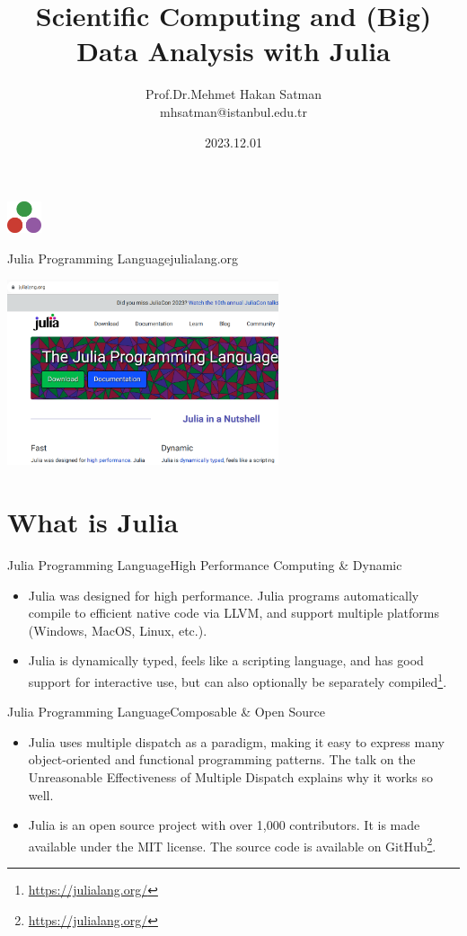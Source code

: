 \documentclass[11pt]{beamer}
\author{Prof.Dr.Mehmet Hakan Satman \\ mhsatman@istanbul.edu.tr}
\title{Scientific Computing and (Big) Data Analysis with Julia}
\institute{Istanbul University}
\date{2023.12.01}
\begin{document}
\begin{frame}
\includegraphics[width=1cm]{images/julia.png}
\titlepage
\end{frame}


\begin{frame}[fragile]{Julia Programming Language}{julialang.org}
	\begin{center}
		\includegraphics[width=8cm]{images/thesite.png}
	\end{center}
\end{frame}

\section{What is Julia}
\begin{frame}[fragile]{Julia Programming Language}{High Performance Computing \& Dynamic}
\begin{itemize}
	\item Julia was designed for high performance. Julia programs automatically compile to efficient native code via LLVM, and support multiple platforms (Windows, MacOS, Linux, etc.).
	
	\item Julia is dynamically typed, feels like a scripting language, and has good support for interactive use, but can also optionally be separately compiled\footnote{\url{https://julialang.org/}}.
\end{itemize}
\end{frame}



\begin{frame}[fragile]{Julia Programming Language}{Composable \& Open Source}
	\begin{itemize}
		\item Julia uses multiple dispatch as a paradigm, making it easy to express many object-oriented and functional programming patterns. The talk on the Unreasonable Effectiveness of Multiple Dispatch explains why it works so well.
		\item Julia is an open source project with over 1,000 contributors. It is made available under the MIT license. The source code is available on GitHub\footnote{\url{https://julialang.org/}}.
	\end{itemize}
\end{frame}
\end{document}
